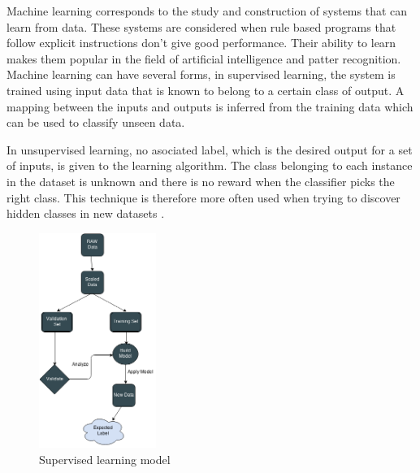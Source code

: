 Machine learning corresponds to the study and construction of systems that can learn from data. These systems are considered when rule based programs that follow explicit instructions don't give good performance. Their ability to learn makes them popular in the field of artificial intelligence and patter recognition. Machine learning can have several forms, in supervised learning, the system is trained using input data that is known to belong to a certain class of output. A mapping between the inputs and outputs is inferred from the training data which can be used to classify unseen data.\cite{cord2008machine}

In unsupervised learning, no asociated label, which is the desired output for a set of inputs, is given to the learning algorithm. The class belonging to each instance in the dataset is unknown and there is no reward when the classifier picks the right class. This technique is therefore more often used when trying to discover hidden classes in new datasets \cite{maglogiannis2007emerging}.


\begin{figure}[H]
\centering
    \includegraphics[width=38mm,scale=0.3]{./img/SL.png}
    \caption{Supervised learning model}
    \label{fig:SL}
\end{figure}



